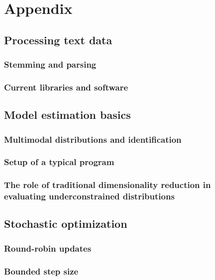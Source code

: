 \chapter{Appendix}

\section{Processing text data}


\subsection{Stemming and parsing}

\subsection{Current libraries and software}

\section{Model estimation basics}

\subsection{Multimodal distributions and identification}

\subsection{Setup of a typical program}

\subsection{The role of traditional dimensionality reduction in evaluating underconstrained distributions}

\section{Stochastic optimization}

\subsection{Round-robin updates}

\subsection{Bounded step size}
